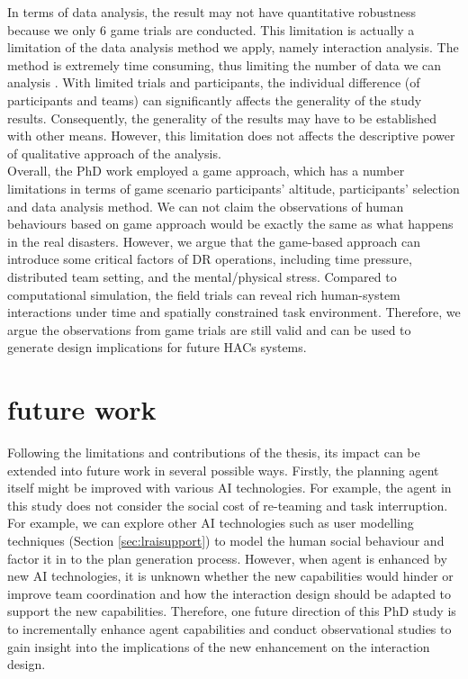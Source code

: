 In terms of data analysis, the result may not have quantitative robustness because we only 6 game trials are conducted. This limitation is actually a limitation of the data analysis method we apply, namely interaction analysis. The method is extremely time consuming, thus limiting the number of data we can analysis \cite{Crabtree2012}. With limited trials and participants, the individual difference (of participants and teams) can significantly affects the generality of the study results. Consequently, the generality of the results may have to be established with other means. However, this limitation does not affects the descriptive power of qualitative approach of the analysis. \\

Overall, the PhD work employed a game approach, which has a number limitations in terms of game scenario participants' altitude, participants' selection and data analysis method. We can not claim the observations of human behaviours based on game approach would be exactly the same as what happens in the real disasters. However, we argue that the game-based approach can introduce some critical factors of DR operations, including time pressure, distributed team setting, and the mental/physical stress. Compared to computational simulation, the field trials can reveal rich human-system interactions under time and spatially constrained task environment. Therefore, we argue the observations from game trials are still valid and can be used to generate design implications for future HACs systems. \\


\section{future work}
Following the limitations and contributions of the thesis, its impact can be extended into future work in several possible ways. Firstly, the planning agent itself might be improved with various AI technologies. For example, the agent in this study does not consider the social cost of re-teaming and task interruption. For example, we can explore other AI technologies such as user modelling techniques (Section \ref{sec:lraisupport}) to model the human social behaviour and factor it in to the plan generation process.  However, when agent is enhanced by new AI technologies, it is unknown whether the new capabilities would hinder or improve team coordination and how the interaction design should be adapted to support the new capabilities. Therefore, one future direction of this PhD study is to incrementally enhance agent capabilities and conduct observational studies to gain insight into the implications of the new enhancement on the interaction design.\\

